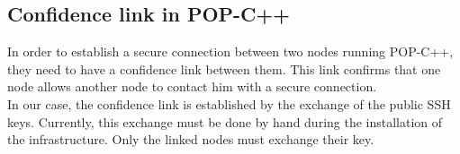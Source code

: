 \subsection{Confidence link in POP-C++}
In order to establish a secure connection between two nodes running POP-C++, they need to have a confidence link between them. This link confirms that one node allows another node to contact him with a secure connection. \\
In our case, the confidence link is established by the exchange of the public SSH keys. Currently, this exchange must be done by hand during the installation of the infrastructure. Only the linked nodes must exchange their key.


